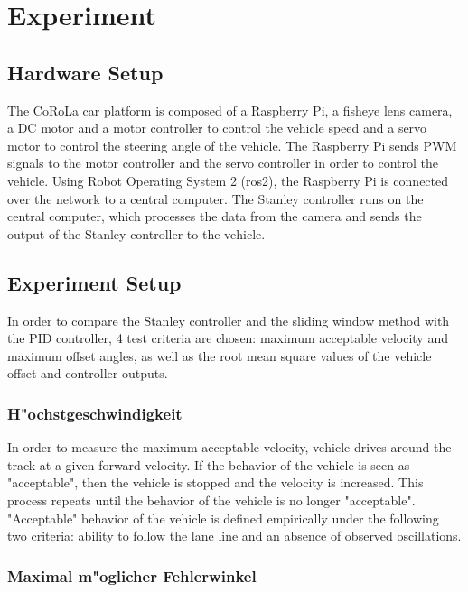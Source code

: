 \documentclass[arbeit=studie,oneside,BCOR=12mm]{ArbeitRST}
\begin{document}
\chapter{Experiment}
\section{Hardware Setup}

The CoRoLa car platform is composed of a Raspberry Pi, a fisheye lens camera, a
DC motor and a motor controller to control the vehicle speed and a servo motor
to control the steering angle of the vehicle. The Raspberry Pi sends PWM
signals to the motor controller and the servo controller in order to control
the vehicle. Using Robot Operating System 2 (ros2), the Raspberry Pi is
connected over the network to a central computer. The Stanley controller runs
on the central computer, which processes the data from the camera and sends the
output of the Stanley controller to the vehicle.

\section{Experiment Setup}

In order to compare the Stanley controller and the sliding window method with
the PID controller, 4 test criteria are chosen: maximum acceptable velocity and
maximum offset angles, as well as the root mean square values of the vehicle
offset and controller outputs.

\subsection{H"ochstgeschwindigkeit}

In order to measure the maximum acceptable velocity, vehicle drives around the
track at a given forward velocity. If the behavior of the vehicle is seen as
"acceptable", then the vehicle is stopped and the velocity is increased. This
process repeats until the behavior of the vehicle is no longer "acceptable".
"Acceptable" behavior of the vehicle is defined empirically under the following
two criteria: ability to follow the lane line and an absence of observed
oscillations.

\subsection{Maximal m"oglicher Fehlerwinkel}
\end{document}
